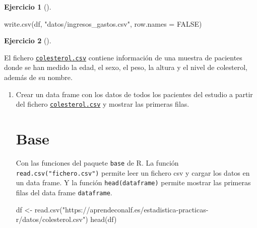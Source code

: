 \documentclass[
  spanish,
  a4paper,
]{scrreport}
\newenvironment{Shaded}{\begin{snugshade}}{\end{snugshade}}
\newcommand{\AttributeTok}[1]{\textcolor[rgb]{0.40,0.45,0.13}{#1}}
\newcommand{\ConstantTok}[1]{\textcolor[rgb]{0.56,0.35,0.01}{#1}}
\newcommand{\FunctionTok}[1]{\textcolor[rgb]{0.28,0.35,0.67}{#1}}
\newcommand{\NormalTok}[1]{\textcolor[rgb]{0.00,0.23,0.31}{#1}}
\newcommand{\OtherTok}[1]{\textcolor[rgb]{0.00,0.23,0.31}{#1}}
\newcommand{\StringTok}[1]{\textcolor[rgb]{0.13,0.47,0.30}{#1}}
\theoremstyle{definition}
\newtheorem{exercise}{Ejercicio}[chapter]
\theoremstyle{remark}
\begin{document}
\begin{exercise}[]
\begin{enumerate}
\begin{tcolorbox}
\begin{Shaded}
\begin{Highlighting}[]
\FunctionTok{write.csv}\NormalTok{(df, }\StringTok{"datos/ingresos\_gastos.csv"}\NormalTok{, }\AttributeTok{row.names =} \ConstantTok{FALSE}\NormalTok{)}
\end{Highlighting}
\end{Shaded}

  \end{tcolorbox}
\end{enumerate}

\end{exercise}

\begin{exercise}[]\protect\hypertarget{exr-dataframes-2}{}\label{exr-dataframes-2}

El fichero \href{datos/colesterol.csv}{\texttt{colesterol.csv}} contiene
información de una muestra de pacientes donde se han medido la edad, el
sexo, el peso, la altura y el nivel de colesterol, además de su nombre.

\begin{enumerate}
\def\labelenumi{\alph{enumi}.}
\item
  Crear un data frame con los datos de todos los pacientes del estudio a
  partir del fichero
  \href{datos/colesterol.csv}{\texttt{colesterol.csv}} y mostrar las
  primeras filas.

  \begin{tcolorbox}[enhanced jigsaw, colback=white, coltitle=black, toprule=.15mm, rightrule=.15mm, opacitybacktitle=0.6, opacityback=0, bottomtitle=1mm, toptitle=1mm, titlerule=0mm, breakable, leftrule=.75mm, title=\textcolor{quarto-callout-tip-color}{\faLightbulb}\hspace{0.5em}{Solución}, arc=.35mm, left=2mm, bottomrule=.15mm, colframe=quarto-callout-tip-color-frame, colbacktitle=quarto-callout-tip-color!10!white]

  \section{Base}

  Con las funciones del paquete \texttt{base} de R. La función
  \texttt{read.csv("fichero.csv")} permite leer un fichero csv y cargar
  los datos en un data frame. Y la función \texttt{head(dataframe)}
  permite mostrar las primeras filas del data frame \texttt{dataframe}.

\begin{Shaded}
\begin{Highlighting}[]
\NormalTok{df }\OtherTok{\textless{}{-}} \FunctionTok{read.csv}\NormalTok{(}\StringTok{"https://aprendeconalf.es/estadistica{-}practicas{-}r/datos/colesterol.csv"}\NormalTok{)}
\FunctionTok{head}\NormalTok{(df)}
\end{Highlighting}
\end{Shaded}


\end{tcolorbox}
\end{enumerate}
\end{exercise}
\end{document}

